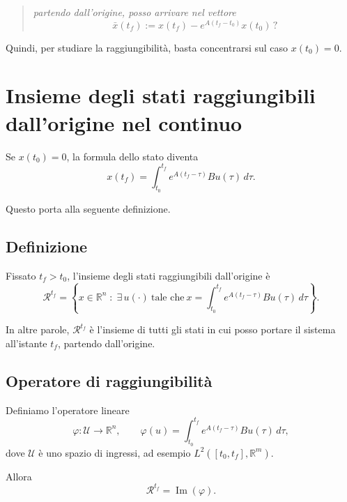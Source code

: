 \begin{quote}
\emph{partendo dall’origine, posso arrivare nel vettore}
\[
\bar x(t_f):=x(t_f)-e^{A(t_f-t_0)}x(t_0)\, ?
\]
\end{quote}

Quindi, per studiare la raggiungibilità, basta concentrarsi sul caso \(x(t_0)=0\).

\section{Insieme degli stati raggiungibili dall'origine nel continuo}

Se \(x(t_0)=0\), la formula dello stato diventa
\begin{equation}
x(t_f)=\int_{t_0}^{t_f} e^{A(t_f-\tau)}Bu(\tau)\,d\tau.
\label{eq:L11_raggiungibile_tc}
\end{equation}

Questo porta alla seguente definizione.

\subsection*{Definizione}
Fissato \(t_f>t_0\), l’insieme degli stati raggiungibili dall’origine è
\begin{equation}
\mathcal{R}^{t_f}
=
\left\{
x\in\mathbb{R}^n \;:\;
\exists\,u(\cdot)\ \text{tale che}\
x=
\int_{t_0}^{t_f} e^{A(t_f-\tau)}Bu(\tau)\,d\tau
\right\}.
\label{eq:L11_def_R_tf}
\end{equation}

In altre parole, \(\mathcal{R}^{t_f}\) è l’insieme di tutti gli stati in cui posso portare il sistema all’istante \(t_f\), partendo dall’origine.

\subsection{Operatore di raggiungibilità}

Definiamo l’operatore lineare
\begin{equation}
\varphi:\mathcal{U}\to\mathbb{R}^n,
\qquad
\varphi(u)=\int_{t_0}^{t_f} e^{A(t_f-\tau)}Bu(\tau)\,d\tau,
\label{eq:L11_operatore_phi}
\end{equation}
dove \(\mathcal{U}\) è uno spazio di ingressi, ad esempio \(L^2([t_0,t_f],\mathbb{R}^m)\).

Allora
\begin{equation}
\mathcal{R}^{t_f}=\operatorname{Im}(\varphi).
\label{eq:L11_Rtf_immagine_phi}
\end{equation}

